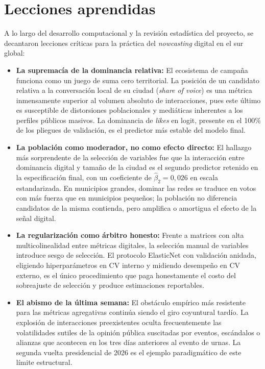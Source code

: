 \section{Lecciones aprendidas}

A lo largo del desarrollo computacional y la revisión estadística del proyecto, se decantaron lecciones críticas para la práctica del \textit{nowcasting} digital en el sur global:

\begin{itemize}
    \item \textbf{La supremacía de la dominancia relativa:} El ecosistema de campaña funciona como un juego de suma cero territorial. La posición de un candidato relativa a la conversación local de su ciudad (\textit{share of voice}) es una métrica inmensamente superior al volumen absoluto de interacciones, pues este último es susceptible de distorsiones poblacionales y mediáticas inherentes a los perfiles públicos masivos. La dominancia de \textit{likes} en logit, presente en el 100\% de los pliegues de validación, es el predictor más estable del modelo final.

    \item \textbf{La población como moderador, no como efecto directo:} El hallazgo más sorprendente de la selección de variables fue que la interacción entre dominancia digital y tamaño de la ciudad es el segundo predictor retenido en la especificación final, con un coeficiente de $\hat{\beta}_2 = 0{,}026$ en escala estandarizada. En municipios grandes, dominar las redes se traduce en votos con más fuerza que en municipios pequeños; la población no diferencia candidatos de la misma contienda, pero amplifica o amortigua el efecto de la señal digital.

    \item \textbf{La regularización como árbitro honesto:} Frente a matrices con alta multicolinealidad entre métricas digitales, la selección manual de variables introduce sesgo de selección. El protocolo ElasticNet con validación anidada, eligiendo hiperparámetros en CV interno y midiendo desempeño en CV externo, es el único procedimiento que paga honestamente el costo del sobreajuste de selección y produce estimaciones reportables.

    \item \textbf{El abismo de la última semana:} El obstáculo empírico más resistente para las métricas agregativas continúa siendo el giro coyuntural tardío. La explosión de interacciones preexistentes oculta frecuentemente las volatilidades sutiles de la opinión pública suscitadas por eventos, escándalos o alianzas que acontecen en los tres días anteriores al evento de urnas. La segunda vuelta presidencial de 2026 es el ejemplo paradigmático de este límite estructural.


\end{itemize}
